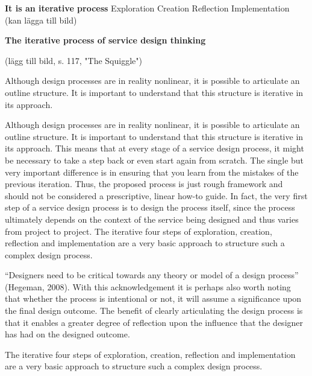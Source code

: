 \textbf{It is an iterative process}
Exploration
Creation
Reflection
Implementation
(kan lägga till bild)

\textbf{The iterative process of service design thinking}

(lägg till bild, s. 117, "The Squiggle")

Although design processes are in reality nonlinear, it is possible to articulate an outline structure. It is important to understand that this structure is iterative in its approach.

Although design processes are in reality nonlinear, it is possible to articulate an outline structure. It is important to understand that this structure is iterative in its approach.
This means that at every stage of a service design process, it might be necessary to take a step back or even start again from scratch. The single but very important difference is in ensuring that you learn from the mistakes of the previous iteration. Thus, the proposed process is just rough framework and should not be considered a prescriptive, linear how-to guide. In fact, the very first step of a service design process is to design the process itself, since the process ultimately depends on the context of the service being designed and thus varies from project to project.
The iterative four steps of exploration, creation, reflection and implementation are a very basic approach to structure such a complex design process.

“Designers need to be critical towards any theory or model of a design process” (Hegeman, 2008). With this acknowledgement it is perhaps also worth noting that whether the process is intentional or not, it will assume a significance upon the final design outcome. The benefit of clearly articulating the design process is that it enables a greater degree of reflection upon the influence that the designer has had on the designed outcome.

The iterative four steps of exploration, creation, reflection and
implementation are a very basic approach to structure such a complex design process.


